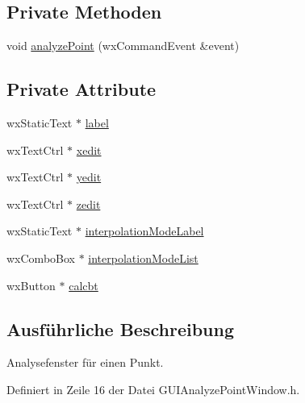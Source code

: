 \subsection*{Private Methoden}
\begin{DoxyCompactItemize}
\item 
void \hyperlink{classGUIAnalyzePointWindow_aa84ea9958e8b41423f01316d01ba5151}{analyze\-Point} (wx\-Command\-Event \&event)
\end{DoxyCompactItemize}
\subsection*{Private Attribute}
\begin{DoxyCompactItemize}
\item 
wx\-Static\-Text $\ast$ \hyperlink{classGUIAnalyzePointWindow_ae3f474800a7f7d9e4a897bdf33510f01}{label}
\item 
wx\-Text\-Ctrl $\ast$ \hyperlink{classGUIAnalyzePointWindow_a4c3d50b2c5c38b8b757cdb1c04ea83b6}{xedit}
\item 
wx\-Text\-Ctrl $\ast$ \hyperlink{classGUIAnalyzePointWindow_ac4352df05ac2a001551801a90fc8bc42}{yedit}
\item 
wx\-Text\-Ctrl $\ast$ \hyperlink{classGUIAnalyzePointWindow_a173e639b35cc6c18a74fb746b8664c8c}{zedit}
\item 
wx\-Static\-Text $\ast$ \hyperlink{classGUIAnalyzePointWindow_a6a1b5c74ab4aca0f3ccea3ef83043b35}{interpolation\-Mode\-Label}
\item 
wx\-Combo\-Box $\ast$ \hyperlink{classGUIAnalyzePointWindow_a6b2da34e788e56e70789d2cfc9767357}{interpolation\-Mode\-List}
\item 
wx\-Button $\ast$ \hyperlink{classGUIAnalyzePointWindow_a2650076436d57254fa9dd0df3783593e}{calcbt}
\end{DoxyCompactItemize}


\subsection{Ausführliche Beschreibung}
Analysefenster für einen Punkt. 

Definiert in Zeile 16 der Datei G\-U\-I\-Analyze\-Point\-Window.\-h.



